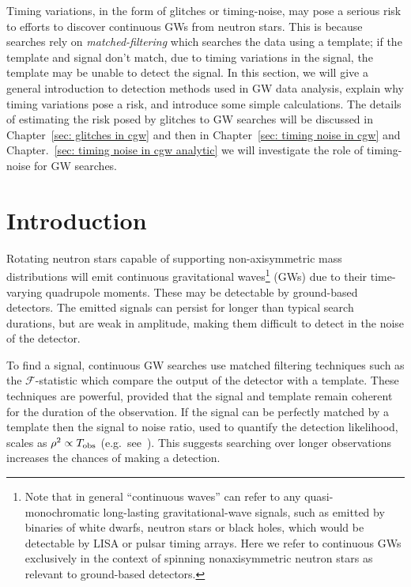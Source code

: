 \documentclass[../full_thesis/full_thesis.tex]{subfiles}
\begin{document}
Timing variations, in the form of glitches or timing-noise, may pose a serious
risk to efforts to discover continuous GWs from neutron stars. This is because
searches rely on \emph{matched-filtering} which searches the data using a
template; if the template and signal don't match, due to timing variations in
the signal, the template may be unable to detect the signal. In this section,
we will give a general introduction to detection methods used in GW data
analysis, explain why timing variations pose a risk, and introduce some simple
calculations. The details of estimating the risk posed by glitches to GW
searches will be discussed in Chapter~\ref{sec: glitches in cgw} and then in
Chapter~\ref{sec: timing noise in cgw} and Chapter.~\ref{sec: timing noise in
cgw analytic} we will investigate the role of timing-noise for GW searches.

\section{Introduction}
Rotating neutron stars capable of supporting non-axisymmetric mass
distributions will emit continuous gravitational
waves\footnote{Note that in general ``continuous waves'' can
    refer to any quasi-monochromatic long-lasting gravitational-wave
        signals, such as emitted by binaries of white dwarfs, neutron
        stars or black holes, which would be detectable by LISA or pulsar
        timing arrays. Here we refer to continuous GWs exclusively in the context of
        spinning nonaxisymmetric neutron stars as relevant to ground-based
        detectors.}
(GWs) due to their
time-varying quadrupole moments. These may be detectable by ground-based detectors. The emitted
signals can persist for longer than
typical search durations, but are weak in amplitude, making them difficult to detect
in the noise of the detector.

To find a signal, continuous GW searches use matched
filtering techniques such as the $\mathcal{F}$-statistic \citep{Jaranowski1998}
which compare the output of the detector with a template.  These techniques are
powerful, provided that the signal and template remain coherent for the duration
of the observation. If the signal can be perfectly matched by a template then
the signal to noise ratio, used to quantify the detection likelihood, scales as
$\rho^{2} \propto T_{\textrm{obs}}$ (e.g.\ see~\citep{Prix2009}). This suggests searching
over longer observations increases the chances of making a detection.
\end{document}
